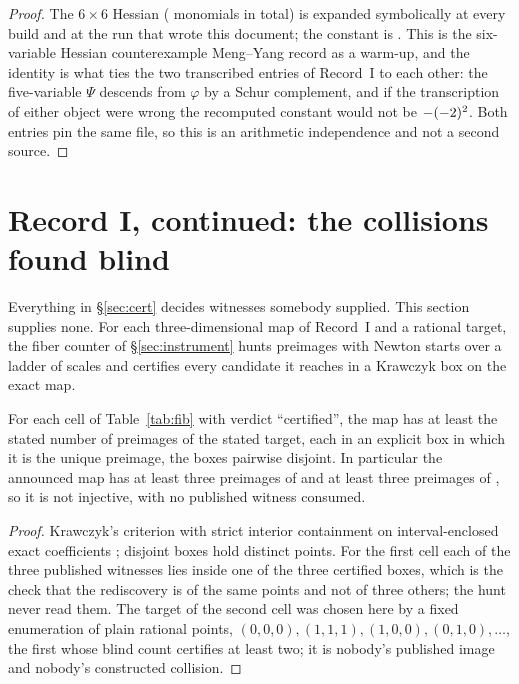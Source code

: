 \documentclass[11pt]{article}
\begin{document}
\begin{proof}
The $6\times6$ Hessian (\DoublingHessMonos{} monomials in total) is expanded symbolically at
every build and at the run that wrote this document; the constant is \DoublingDet. This is the
six-variable Hessian counterexample Meng--Yang record as a warm-up, and the identity is what ties
the two transcribed entries of Record~I to each other: the five-variable $\Psi$ descends from
$\varphi$ by a Schur complement, and if the transcription of either object were wrong the
recomputed constant would not be $-(-2)^2$. Both entries pin the same file, so this is an
arithmetic independence and not a second source.
\end{proof}

\section{Record I, continued: the collisions found blind}\label{sec:blind}

Everything in \S\ref{sec:cert} decides witnesses somebody supplied. This section supplies none.
For each three-dimensional map of Record~I and a rational target, the fiber counter of
\S\ref{sec:instrument} hunts preimages with \FibStarts{} Newton starts over a ladder of scales and
certifies every candidate it reaches in a Krawczyk box on the exact map.

\begin{theorem}\label{thm:blind}
For each cell of Table~\ref{tab:fib} with verdict ``certified'', the map has at least the stated
number of preimages of the stated target, each in an explicit box in which it is the unique
preimage, the boxes pairwise disjoint. In particular the announced map has at least three
preimages of \AlpogeImage{} and at least three preimages of \OwnTarget, so it is not injective,
with no published witness consumed.
\end{theorem}

\begin{proof}
Krawczyk's criterion with strict interior containment on interval-enclosed exact coefficients
\cite{Krawczyk1969}; disjoint boxes hold distinct points. For the first cell each of the three
published witnesses lies inside one of the three certified boxes, which is the check that the
rediscovery is of the same points and not of three others; the hunt never read them. The target
\OwnTarget{} of the second cell was chosen here by a fixed enumeration of plain rational points,
$(0,0,0),(1,1,1),(1,0,0),(0,1,0),\dots$, the first whose blind count certifies at least two; it is
nobody's published image and nobody's constructed collision.
\end{proof}
\end{document}
